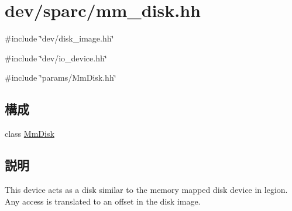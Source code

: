 \hypertarget{mm__disk_8hh}{
\section{dev/sparc/mm\_\-disk.hh}
\label{mm__disk_8hh}
}
{\ttfamily \#include \char`\"{}dev/disk\_\-image.hh\char`\"{}}\par
{\ttfamily \#include \char`\"{}dev/io\_\-device.hh\char`\"{}}\par
{\ttfamily \#include \char`\"{}params/MmDisk.hh\char`\"{}}\par
\subsection*{構成}
\begin{DoxyCompactItemize}
\item 
class \hyperlink{classMmDisk}{MmDisk}
\end{DoxyCompactItemize}


\subsection{説明}
This device acts as a disk similar to the memory mapped disk device in legion. Any access is translated to an offset in the disk image. 